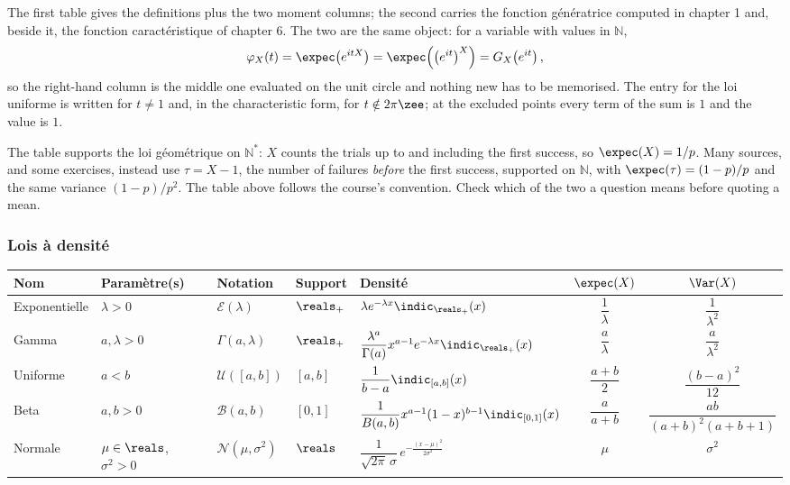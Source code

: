 The first table gives the definitions plus the two moment columns; the second carries
the fonction génératrice computed in chapter 1 and, beside it, the fonction
caractéristique of chapter 6. The two are the same object: for a variable with
values in $\mathbb{N}$,
\[
  \varphi_{X}(t) = \expec\!\left(e^{itX}\right)
    = \expec\!\left(\left(e^{it}\right)^{X}\right) = G_{X}\!\left(e^{it}\right),
\]
so the right-hand column is the middle one evaluated on the unit circle and nothing
new has to be memorised. The entry for the loi uniforme is written for $t \neq 1$
and, in the characteristic form, for $t \notin 2\pi\zee$; at the excluded points
every term of the sum is $1$ and the value is $1$.

\begin{remark}
  The table supports the loi géométrique on $\mathbb{N}^{*}$: $X$ counts the
  trials up to and including the first success, so $\expec(X) = 1/p$. Many
  sources, and some exercises, instead use $\tau = X - 1$, the number of failures
  \emph{before} the
  first success, supported on $\mathbb{N}$, with $\expec(\tau) = (1-p)/p$ and the
  same variance $(1-p)/p^{2}$. The table above follows the course's convention.
  Check which of the two a question means before quoting a mean.
\end{remark}

\subsubsection{Lois à densité}

\begin{center}
\footnotesize
\setlength{\tabcolsep}{4pt}
\begin{tabular}{lllllcc}
  \toprule
  Nom & Paramètre(s) & Notation & Support & Densité & $\expec(X)$ & $\Var(X)$ \\
  \midrule
  Exponentielle & $\lambda > 0$ & $\mathcal{E}(\lambda)$ & $\reals_{+}$
    & $\lambda e^{-\lambda x}\indic_{\reals_{+}}(x)$
    & $\dfrac{1}{\lambda}$ & $\dfrac{1}{\lambda^{2}}$ \\[5pt]
  Gamma & $a, \lambda > 0$ & $\Gamma(a,\lambda)$ & $\reals_{+}$
    & $\dfrac{\lambda^{a}}{\Gamma(a)}x^{a-1}e^{-\lambda x}\indic_{\reals_{+}}(x)$
    & $\dfrac{a}{\lambda}$ & $\dfrac{a}{\lambda^{2}}$ \\[7pt]
  Uniforme & $a < b$ & $\mathcal{U}([a,b])$ & $[a,b]$
    & $\dfrac{1}{b-a}\indic_{[a,b]}(x)$
    & $\dfrac{a+b}{2}$ & $\dfrac{(b-a)^{2}}{12}$ \\[7pt]
  Beta & $a, b > 0$ & $\mathcal{B}(a,b)$ & $[0,1]$
    & $\dfrac{1}{B(a,b)}x^{a-1}(1-x)^{b-1}\indic_{[0,1]}(x)$
    & $\dfrac{a}{a+b}$ & $\dfrac{ab}{(a+b)^{2}(a+b+1)}$ \\[7pt]
  Normale & $\mu \in \reals$, $\sigma^{2} > 0$ & $\mathcal{N}(\mu,\sigma^{2})$
    & $\reals$
    & $\dfrac{1}{\sqrt{2\pi}\,\sigma}\,e^{-\frac{(x-\mu)^{2}}{2\sigma^{2}}}$
    & $\mu$ & $\sigma^{2}$ \\
  \bottomrule
\end{tabular}
\end{center}

